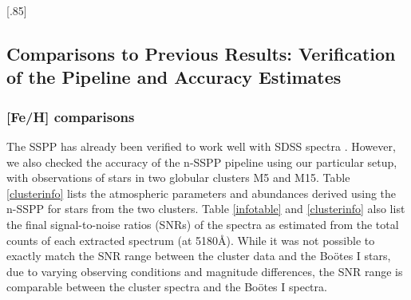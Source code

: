 \documentclass[iop]{emulateapj}
\def\bootes{Bo\"{o}tes I}
\begin{document}
\begin{figure*}
\begin{center}
\scalebox{.85}[.85]{ }
\end{center}
\end{figure*} 


\subsection{Comparisons to Previous Results: Verification of the Pipeline and Accuracy Estimates}

\subsubsection{[Fe/H] comparisons}

The SSPP has already been verified to work well with SDSS spectra
\citep{smolinski11}. However, we also
checked the accuracy of the n-SSPP pipeline using our particular setup, with
observations of stars in two globular clusters M5 and M15. Table
\ref{clusterinfo} lists the atmospheric parameters and abundances derived using
the n-SSPP for
stars from the two clusters. Table \ref{infotable} and
\ref{clusterinfo} also list the final signal-to-noise ratios (SNRs) of
the spectra as estimated from the total counts of each extracted spectrum
(at 5180\AA{}). While it was not possible to exactly match the SNR range between the
cluster data and the \bootes{} stars, due to varying observing conditions and
magnitude differences, the SNR range is comparable between the cluster spectra
and the \bootes{} spectra. 
\end{document}
